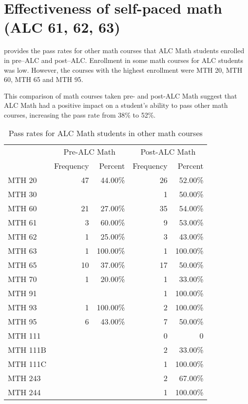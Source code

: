 \chapter{Effectiveness of self-paced math (ALC 61, 62, 63)}
\label{app:sec:effectivenessALC}

 provides the pass rates for other math courses that ALC Math students 
enrolled in pre--ALC and post--ALC.  Enrollment in some math courses for 
ALC students was low.  However, the courses with the highest enrollment 
were MTH 20, MTH 60, MTH 65 and MTH 95.

This comparison of math courses taken pre- and post-ALC Math suggest 
that ALC Math had a positive impact on a student's ability to pass other 
math courses, increasing the pass rate from 38\% to 52\%. 

\begin{table}[!htb]
	\centering
	\caption{Pass rates for ALC Math students in other math courses}
	\label{app:tab:effectivenessALC}
	\begin{tabular}{lrrrr}
		\toprule
		& \multicolumn{2}{c}{Pre-ALC Math}    & \multicolumn{2}{c}{Post-ALC Math}           \\ 
		          & Frequency & Percent  & Frequency & Percent  \\ 
		\midrule
		MTH 20   & 47        & 44.00\%  & 26        & 52.00\%  \\ 
		MTH 30   &           &          & 1         & 50.00\%  \\ 
		MTH 60   & 21        & 27.00\%  & 35        & 54.00\%  \\ 
		MTH 61   & 3         & 60.00\%  & 9         & 53.00\%  \\ 
		MTH 62   & 1         & 25.00\%  & 3         & 43.00\%  \\ 
		MTH 63   & 1         & 100.00\% & 1         & 100.00\% \\ 
		MTH 65   & 10        & 37.00\%  & 17        & 50.00\%  \\ 
		MTH 70   & 1         & 20.00\%  & 1         & 33.00\%  \\ 
		MTH 91   &           &          & 1         & 100.00\% \\ 
		MTH 93   & 1         & 100.00\% & 2         & 100.00\% \\ 
		MTH 95   & 6         & 43.00\%  & 7         & 50.00\%  \\ 
		MTH 111  &           &          & 0         & 0        \\ 
		MTH 111B &           &          & 2         & 33.00\%  \\ 
		MTH 111C &           &          & 1         & 100.00\% \\ 
		MTH 243  &           &          & 2         & 67.00\%  \\ 
		MTH 244  &           &          & 1         & 100.00\% \\ 
		\bottomrule
	\end{tabular}
\end{table}
